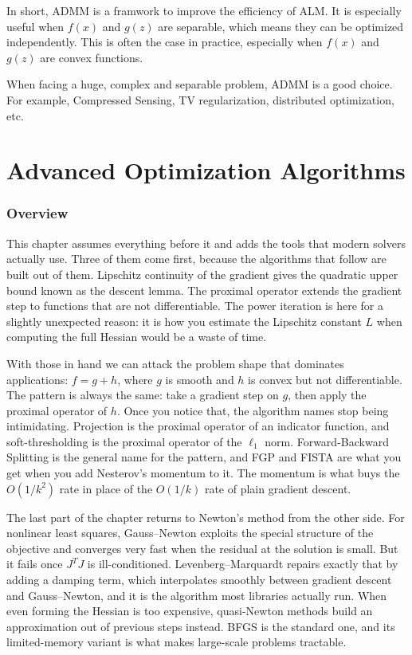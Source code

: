 \documentclass[lang=en,color=blue,mode=fancy,titlestyle=hang]{elegantbook}
\begin{document}
In short, ADMM is a framwork to improve the efficiency of ALM. It is especially
useful when $f(x)$ and $g(z)$ are separable, which means they can be optimized
independently. This is often the case in practice, especially when $f(x)$ and
$g(z)$ are convex functions.

When facing a huge, complex and separable problem, ADMM is a good choice.
For example, Compressed Sensing, TV regularization, distributed optimization, etc.

\chapter{Advanced Optimization Algorithms}

\subsection*{Overview}

This chapter assumes everything before it and adds the tools that modern solvers actually
use. Three of them come first, because the algorithms that follow are built out of them.
Lipschitz continuity of the gradient gives the quadratic upper bound known as the descent
lemma. The proximal operator extends the gradient step to functions that are not
differentiable. The power iteration is here for a slightly unexpected reason: it is how you
estimate the Lipschitz constant $L$ when computing the full Hessian would be a waste of
time.

With those in hand we can attack the problem shape that dominates applications:
$f = g + h$, where $g$ is smooth and $h$ is convex but not differentiable. The pattern is
always the same: take a gradient step on $g$, then apply the proximal operator of $h$. Once
you notice that, the algorithm names stop being intimidating. Projection is the proximal
operator of an indicator function, and soft-thresholding is the proximal operator of the
$\ell_1$ norm. Forward-Backward Splitting is the general name for the pattern, and FGP and
FISTA are what you get when you add Nesterov's momentum to it. The momentum is what buys
the $O(1/k^2)$ rate in place of the $O(1/k)$ rate of plain gradient descent.

The last part of the chapter returns to Newton's method from the other side. For nonlinear
least squares, Gauss–Newton exploits the special structure of the objective and converges
very fast when the residual at the solution is small. But it fails once $J^T J$ is
ill-conditioned. Levenberg–Marquardt repairs exactly that by adding a damping term, which
interpolates smoothly between gradient descent and Gauss–Newton, and it is the algorithm
most libraries actually run. When even forming the Hessian is too expensive, quasi-Newton
methods build an approximation out of previous steps instead. BFGS is the standard one, and
its limited-memory variant is what makes large-scale problems tractable.
\end{document}
